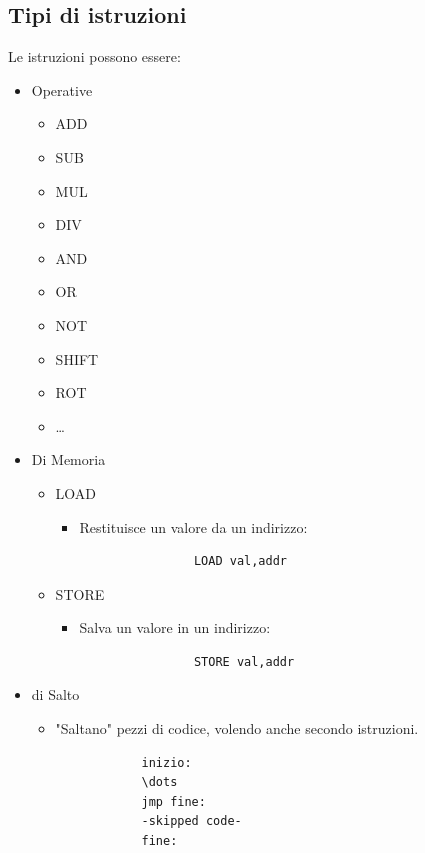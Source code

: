 \documentclass[12pt,a4paper]{article}
\begin{document}
\subsection{Tipi di istruzioni}
Le istruzioni possono essere:
\begin{itemize}
    \item Operative
    \begin{itemize}
        \item ADD
        \item SUB
        \item MUL
        \item DIV
        \item AND
        \item OR
        \item NOT
        \item SHIFT
        \item ROT
        \item \dots
    \end{itemize}
    \item Di Memoria
    \begin{itemize}
        \item LOAD
        \begin{itemize}
            \item Restituisce un valore da un indirizzo:\\
            \begin{lstlisting}
                LOAD val,addr
            \end{lstlisting}
        \end{itemize}
        \item STORE
        \begin{itemize}
            \item Salva un valore in un indirizzo:\\
            \begin{lstlisting}
                STORE val,addr
            \end{lstlisting}
        \end{itemize}
    \end{itemize}
    \item di Salto
    \begin{itemize}
        \item "Saltano" pezzi di codice, volendo anche secondo istruzioni.\\
        \begin{lstlisting}
            inizio:
            \dots
            jmp fine:
            -skipped code-
            fine:
        \end{lstlisting}
    \end{itemize}
\end{itemize}
\end{document}
